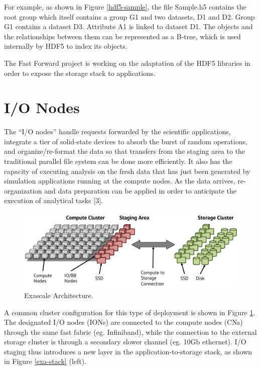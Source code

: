 \documentclass[conference]{IEEEtran}
\begin{document}
For example, as shown in Figure \ref{hdf5-sample}, the file
Sample.h5 contains the root group which itself contains a
group G1 and two datasets, D1 and D2. Group
G1 contains a dataset D3. Attribute A1 is
linked to dataset D1. The objects and the relationships between
them can be represented as a B-tree, which is used internally by HDF5 to
index its objects.

The Fast Forward project is working on the adaptation of the HDF5
libraries in order to expose the storage stack to applications.

\section{I/O Nodes}
The ``I/O nodes'' handle 
requests forwarded by the scientific applications, integrate a tier of
solid-state devices to absorb the burst of random operations, and
organize/re-format the data so that transfers from the staging area to
the traditional parallel file system can be done more efficiently. It
also has the capacity of executing analysis on the fresh data that has
just been generated by simulation applications running at the compute
nodes. As the data arrives, re-organization and data preparation can be
applied in order to anticipate the execution of analytical tasks
{[}3{]}.

\begin{figure}[htbp]
\centering
\includegraphics[scale=0.30]{images/exa-arch.png}
\caption{Exascale Architecture. \label{exa-arch}}
\end{figure}

A common cluster configuration for this type of deployment is shown in
Figure \ref{exa-arch}. The designated I/O nodes (IONs) are connected to
the compute nodes (CNs) through the same fast fabric (eg. Infiniband),
while the connection to the external storage cluster is through a
secondary slower channel (eg. 10Gb ethernet). I/O staging thus
introduces a new layer in the application-to-storage stack, as shown in
Figure \ref{exa-stack} (left).
\end{document}
